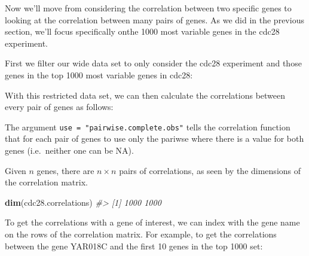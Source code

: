 \documentclass[]{book}
\newenvironment{Shaded}{\begin{snugshade}}{\end{snugshade}}
\newcommand{\CommentTok}[1]{\textcolor[rgb]{0.56,0.35,0.01}{\textit{#1}}}
\newcommand{\DataTypeTok}[1]{\textcolor[rgb]{0.13,0.29,0.53}{#1}}
\newcommand{\KeywordTok}[1]{\textcolor[rgb]{0.13,0.29,0.53}{\textbf{#1}}}
\newcommand{\NormalTok}[1]{#1}
\newcommand{\OperatorTok}[1]{\textcolor[rgb]{0.81,0.36,0.00}{\textbf{#1}}}
\newcommand{\StringTok}[1]{\textcolor[rgb]{0.31,0.60,0.02}{#1}}
\theoremstyle{definition}
\theoremstyle{definition}
\theoremstyle{definition}
\theoremstyle{remark}
\begin{document}
Now we'll move from considering the correlation between two specific
genes to looking at the correlation between many pairs of genes. As we
did in the previous section, we'll focus specifically onthe 1000 most
variable genes in the cdc28 experiment.

First we filter our wide data set to only consider the cdc28 experiment
and those genes in the top 1000 most variable genes in cdc28:

\begin{Shaded}
\end{Shaded}

With this restricted data set, we can then calculate the correlations
between every pair of genes as follows:

\begin{Shaded}
\end{Shaded}

The argument \texttt{use\ =\ "pairwise.complete.obs"} tells the
correlation function that for each pair of genes to use only the pariwse
where there is a value for both genes (i.e.~neither one can be NA).

Given \(n\) genes, there are \(n \times n\) pairs of correlations, as
seen by the dimensions of the correlation matrix.

\begin{Shaded}
\begin{Highlighting}[]
\KeywordTok{dim}\NormalTok{(cdc28.correlations)}
\CommentTok{#> [1] 1000 1000}
\end{Highlighting}
\end{Shaded}

To get the correlations with a gene of interest, we can index with the
gene name on the rows of the correlation matrix. For example, to get the
correlations between the gene YAR018C and the first 10 genes in the top
1000 set:
\end{document}
